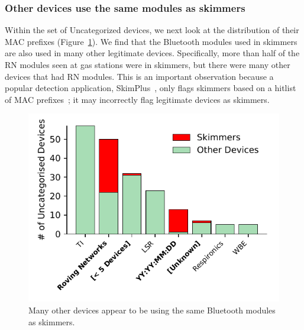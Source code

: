 \subsubsection*{Other devices use the same modules as skimmers} %




Within the set of Uncategorized devices, we next look at the distribution of
their MAC prefixes (Figure~\ref{fig:hist_device_OUI}).
%
%
We find that the Bluetooth modules used in skimmers are also used in many other legitimate
devices.
%
Specifically, more than half of the RN modules seen at gas stations were in
skimmers, but there were many other devices that had RN modules.
%
%
%
This is an important observation because a popular detection application,
SkimPlus~\cite{skimplus}, only flags skimmers based on a hitlist of MAC
prefixes~\cite{scaifeoakland}; it may incorrectly flag legitimate devices as
skimmers.

\begin{figure}[!h]
    \centering
    \includegraphics[width=0.6\linewidth]{skimmer/plots/uncat_hist_device_OUI.pdf}
    \caption{
    \label{fig:hist_device_OUI}
    Many other devices appear to be using the same Bluetooth modules as skimmers.
    }
\end{figure}

